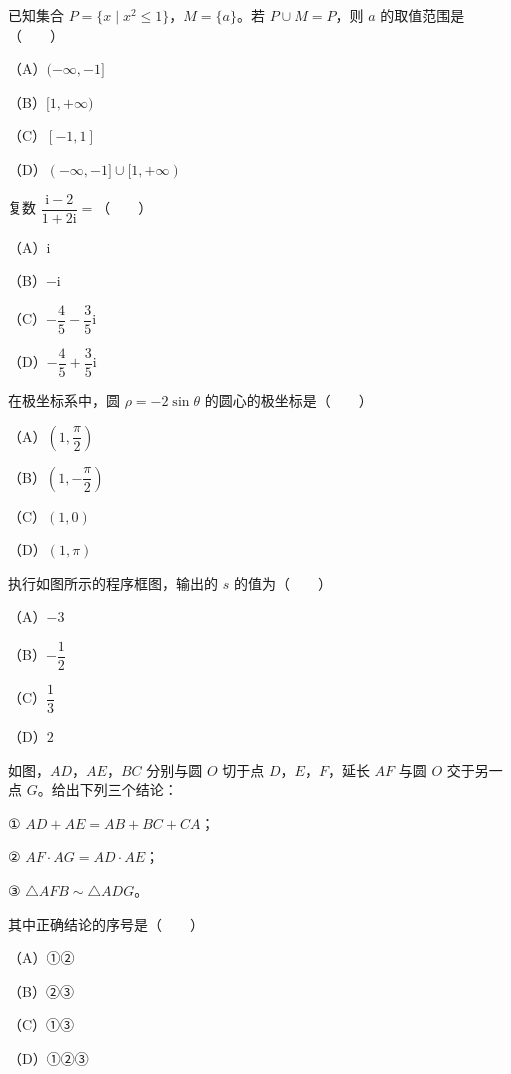 \begin{question}
已知集合 $P=\{x\mid x^2\leqslant 1\}$，$M=\{a\}$。若 $P\cup M=P$，则 $a$ 的取值范围是\mbox{（　　）}

（A）$(-\infty,-1]$

（B）$[1,+\infty)$

（C）$[-1,1]$

（D）$(-\infty,-1]\cup[1,+\infty)$

\end{question}
\begin{question}
复数 $\dfrac{\mathrm{i}-2}{1+2\mathrm{i}}=$\mbox{（　　）}

（A）$\mathrm{i}$

（B）$-\mathrm{i}$

（C）$-\dfrac45-\dfrac35\mathrm{i}$

（D）$-\dfrac45+\dfrac35\mathrm{i}$

\end{question}
\begin{question}
在极坐标系中，圆 $\rho=-2\sin\theta$ 的圆心的极坐标是\mbox{（　　）}

（A）$\left(1,\dfrac{\pi}{2}\right)$

（B）$\left(1,-\dfrac{\pi}{2}\right)$

（C）$(1,0)$

（D）$(1,\pi)$

\Needspace{0.4\textheight}
\end{question}
\begin{question}
执行如图所示的程序框图，输出的 $s$ 的值为\mbox{（　　）}

（A）$-3$

（B）$-\dfrac12$

（C）$\dfrac13$

（D）$2$
\nopagebreak[4]
\begin{center}\end{center}
\nopagebreak[4]
\Needspace{0.4\textheight}
\end{question}
\begin{question}
如图，$AD$，$AE$，$BC$ 分别与圆 $O$ 切于点 $D$，$E$，$F$，延长 $AF$ 与圆 $O$ 交于另一点 $G$。给出下列三个结论：

① $AD+AE=AB+BC+CA$；

② $AF\cdot AG=AD\cdot AE$；

③ $\triangle AFB\sim\triangle ADG$。

其中正确结论的序号是\mbox{（　　）}

（A）①②

（B）②③

（C）①③

（D）①②③
\nopagebreak[4]
\begin{center}\end{center}
\nopagebreak[4]
\end{question}
